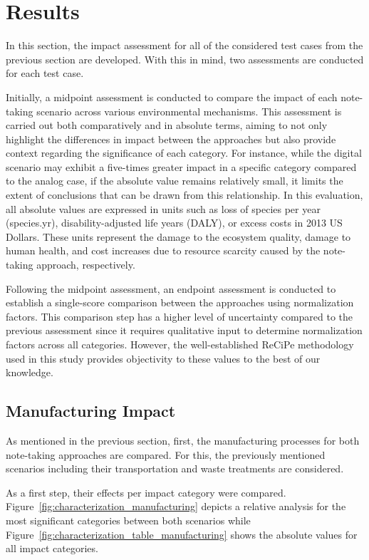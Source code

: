 \section{Results}\label{sec:results}
In this section, the impact assessment for all of the considered test cases from the previous section are developed. With this in mind, two assessments are conducted for each test case. 

Initially, a midpoint assessment is conducted to compare the impact of each note-taking scenario across various environmental mechanisms. This assessment is carried out both comparatively and in absolute terms, aiming to not only highlight the differences in impact between the approaches but also provide context regarding the significance of each category. For instance, while the digital scenario may exhibit a five-times greater impact in a specific category compared to the analog case, if the absolute value remains relatively small, it limits the extent of conclusions that can be drawn from this relationship. In this evaluation, all absolute values are expressed in units such as loss of species per year (species.yr), disability-adjusted life years (DALY), or excess costs in 2013 US Dollars. These units represent the damage to the ecosystem quality, damage to human health, and cost increases due to resource scarcity caused by the note-taking approach, respectively.

Following the midpoint assessment, an endpoint assessment is conducted to establish a single-score comparison between the approaches using normalization factors. This comparison step has a higher level of uncertainty compared to the previous assessment since it requires qualitative input to determine normalization factors across all categories. However, the well-established ReCiPe methodology used in this study provides objectivity to these values to the best of our knowledge.


\subsection{Manufacturing Impact}\label{subsec:results_manufacturing}
As mentioned in the previous section, first, the manufacturing processes for both note-taking approaches are compared. For this, the previously mentioned scenarios including their transportation and waste treatments are considered. 

As a first step, their effects per impact category were compared. Figure~\ref{fig:characterization_manufacturing} depicts a relative analysis for the most significant categories between both scenarios while Figure~\ref{fig:characterization_table_manufacturing} shows the absolute values for all impact categories.


